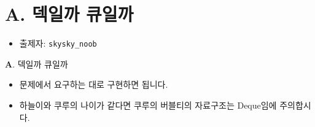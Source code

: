 \section{A. 덱일까 큐일까}

\begin{frame} %
    \begin{itemize}
        \item 출제자: \texttt{skysky\_noob}
    \end{itemize}
\end{frame}

\begin{frame}{\textbf{A}. 덱일까 큐일까}
    \begin{itemize}
        \item 문제에서 요구하는 대로 구현하면 됩니다.
        \item 하늘이와 쿠루의 나이가 같다면 쿠루의 버블티의 자료구조는 Deque임에 주의합시다.
    \end{itemize}
\end{frame}
